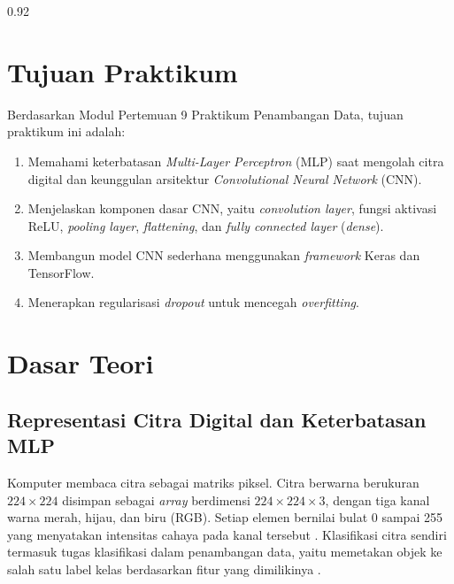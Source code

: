\documentclass[a4paper,oneside,12pt]{report}
\begin{document}
\begin{spacing}{0.92}
	\tableofcontents
\end{spacing}
\clearpage

\setcounter{page}{3}

\chapter[Tujuan Praktikum]{Tujuan Praktikum}
Berdasarkan Modul Pertemuan 9 Praktikum Penambangan Data, tujuan praktikum ini adalah:
\begin{enumerate}[noitemsep, topsep=4pt, parsep=2pt]
	\item Memahami keterbatasan \textit{Multi-Layer Perceptron} (MLP) saat mengolah citra digital dan keunggulan arsitektur \textit{Convolutional Neural Network} (CNN).
	\item Menjelaskan komponen dasar CNN, yaitu \textit{convolution layer}, fungsi aktivasi ReLU, \textit{pooling layer}, \textit{flattening}, dan \textit{fully connected layer} (\textit{dense}).
	\item Membangun model CNN sederhana menggunakan \textit{framework} Keras dan TensorFlow.
	\item Menerapkan regularisasi \textit{dropout} untuk mencegah \textit{overfitting}.
\end{enumerate}

\clearpage

\chapter{Dasar Teori}

\section{Representasi Citra Digital dan Keterbatasan MLP}
Komputer membaca citra sebagai matriks piksel. Citra berwarna berukuran $224 \times 224$ disimpan sebagai \textit{array} berdimensi $224 \times 224 \times 3$, dengan tiga kanal warna merah, hijau, dan biru (RGB). Setiap elemen bernilai bulat 0 sampai 255 yang menyatakan intensitas cahaya pada kanal tersebut \cite{goodfellow2016}. Klasifikasi citra sendiri termasuk tugas klasifikasi dalam penambangan data, yaitu memetakan objek ke salah satu label kelas berdasarkan fitur yang dimilikinya \cite{han2022}.
\end{document}
